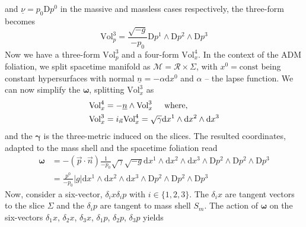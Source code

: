 and $\underline{\nu} = p_0\text{D}p^0$ in the massive and massless cases respectively, 
the three-form becomes
%
\begin{equation}
\text{Vol}^3 _p =\frac{\sqrt{-g}}{-p_0}\text{D}p^1\wedge\text{D}p^2\wedge\text{D}p^3
\end{equation}
%
Now we have a three-form $\text{Vol}^3 _p$ and a four-form $\text{Vol}_x ^4$. 
In the context of the \ac{ADM} foliation, we split spacetime manifold as $\mathcal{M}=\mathcal{R}\times\Sigma$, 
with $x^0 = \text{const}$ being constant hypersurfaces with normal $\underline{n} = - \alpha\text{d}x^0$ 
and $\alpha$ -- the lapse function. 
We can now simplify the $\boldsymbol{\omega}$, splitting $\text{Vol}_x ^3$ as 
%
\begin{equation}
\begin{aligned}
\text{Vol}_x ^4 &= -\underline{n}\wedge\text{Vol}_x ^3 \hspace{5mm} \text{where,} \\
\text{Vol}_x ^3 &= i_{\vec{n}}\text{Vol}_x ^4 = \sqrt{\gamma}\text{d}x^1\wedge\text{d}x^2\wedge\text{d}x^3
\end{aligned}
\end{equation}
%
and the $\boldsymbol{\gamma}$ is the three-metric induced on the slices. 
%
The resulted coordinates, adapted to the mass shell and the spacetime foliation read
%
\begin{equation}
\begin{aligned}
\boldsymbol{\omega} &=-(\vec{p}\cdot\vec{n})\frac{1}{-p_0}\sqrt{\gamma}\sqrt{-g}\text{d}x^1\wedge\text{d}x^2\wedge\text{d}x^3 \wedge\text{D}p^2\wedge\text{D}p^2\wedge\text{D}p^3 \\
&= \frac{p^0}{-p_0}|g|\text{d}x^1 \wedge\text{d}x^2\wedge\text{d}x^3 \wedge\text{D}p^2\wedge\text{D}p^2\wedge\text{D}p^3
\end{aligned}
\end{equation}
%
Now, consider a six-vector, $\delta_i x \delta_i p$ with $i\in\{1,2,3\}$. 
The $\delta_i x$ are tangent vectors to the slice $\Sigma$ and the $\delta_i p$ are tangent to mass shell $S_m$. 
The action of $\boldsymbol{\omega}$ on the six-vectors 
$\delta_1 x$, $\delta_2 x$, $\delta_3 x$, $\delta_1 p$, $\delta_2 p$, $\delta_3 p$ yields
%
